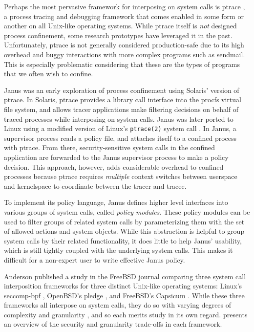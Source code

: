 \documentclass[dvipsnames, 12pt]{article}
\begin{document}
Perhaps the most pervasive framework for interposing on system calls is ptrace
\cite{padala2002_ptrace}, a process tracing and debugging framework that comes
enabled in some form or another on all Unix-like operating systems.  While
ptrace itself is \textit{not} designed process confinement, some research
prototypes \cite{goldberg96_janus, wagner1999_janus} have leveraged it in the
past. Unfortunately, ptrace is not generally considered production-safe due to
its high overhead and buggy interactions with more complex programs such as
sendmail. This is especially problematic considering that these are the types of
programs that we often wish to confine.

Janus \cite{goldberg96_janus,wagner1999_janus} was an early exploration of
process confinement using Solaris' version of ptrace. In Solaris, ptrace
provides a library call interface into the procfs virtual file system, and
allows tracer applications make filtering decisions on behalf of traced
processes while interposing on system calls. Janus was later ported to Linux
using a modified version of Linux's \texttt{ptrace(2)} system call
\cite{wagner1999_janus}. In Janus, a supervisor process reads a policy file, and
attaches itself to a confined process with ptrace. From there,
security-sensitive system calls in the confined application are forwarded to the
Janus supervisor process to make a policy decision. This approach, however, adds
considerable overhead to confined processes because ptrace requires
\textit{multiple} context switches between userspace and kernelspace to
coordinate between the tracer and tracee.

To implement its policy language, Janus defines higher level interfaces into
various groups of system calls, called \textit{policy modules}. These policy
modules can be used to filter groups of related system calls by parameterizing
them with the set of allowed actions and system objects. While this abstraction
is helpful to group system calls by their related functionality, it does little
to help Janus' usability, which is still tightly coupled with the underlying
system calls. This makes it difficult for a non-expert user to write effective
Janus policy.


Anderson published a study in the FreeBSD journal \cite{anderson2017_comparison}
comparing three system call interposition frameworks for three distinct
Unix-like operating systems: Linux's seccomp-bpf \cite{seccomp_bpf,
drewry2012_seccomp_bpf}, OpenBSD's pledge \cite{pledge}, and FreeBSD's Capsicum
\cite{capsicum, watson2010_capsicum}. While these three frameworks all interpose
on system calls, they do so with varying degrees of complexity and granularity
\cite{anderson2017_comparison}, and so each merits study in its own regard.
 presents an overview of the security
and granularity trade-offs in each framework.
\end{document}
